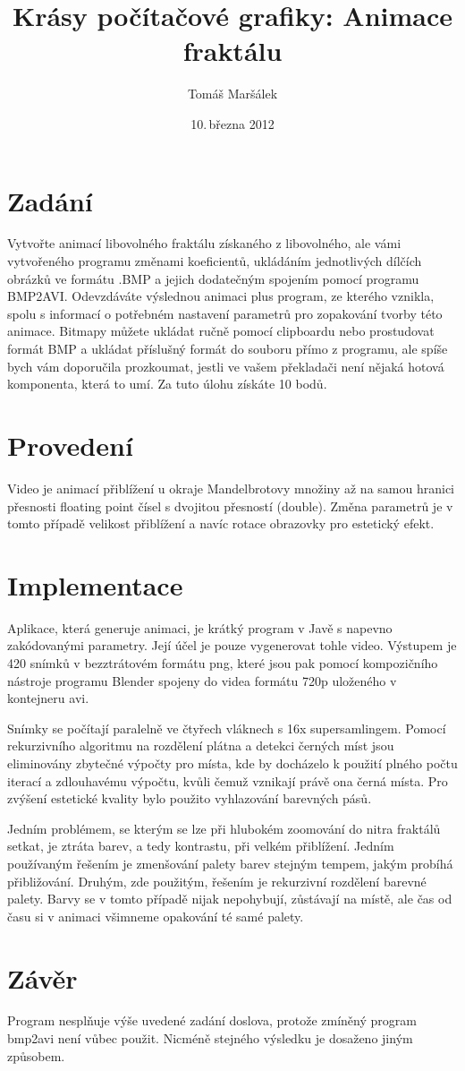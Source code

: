 \documentclass[11pt]{article}
\title{Krásy počítačové grafiky: Animace fraktálu}
\author{Tomáš Maršálek}
\date{10.\,března 2012}
\begin{document}
\maketitle
\section{Zadání}
Vytvořte animací libovolného fraktálu získaného z libovolného, ale vámi
vytvořeného programu změnami koeficientů, ukládáním jednotlivých dílčích
obrázků ve formátu .BMP a jejich dodatečným spojením pomocí programu BMP2AVI.
Odevzdáváte výslednou animaci plus program, ze kterého vznikla, spolu s
informací o potřebném nastavení parametrů pro zopakování tvorby této animace.
Bitmapy můžete ukládat ručně pomocí clipboardu nebo prostudovat formát BMP a
ukládat příslušný formát do souboru přímo z programu, ale spíše bych vám
doporučila prozkoumat, jestli ve vašem překladači není nějaká hotová
komponenta, která to umí. Za tuto úlohu získáte 10 bodů.

\section{Provedení}
Video je animací přiblížení u okraje Mandelbrotovy množiny až na samou hranici
přesnosti floating point čísel s dvojitou přesností (double). Změna parametrů
je v tomto případě velikost přiblížení a navíc rotace obrazovky pro estetický
efekt.

\section{Implementace}
Aplikace, která generuje animaci, je krátký program v Javě s napevno
zakódovanými parametry. Její účel je pouze vygenerovat tohle video. Výstupem je
420 snímků v bezztrátovém formátu png, které jsou pak pomocí kompozičního
nástroje programu Blender spojeny do videa formátu 720p uloženého v kontejneru
avi.

Snímky se počítají paralelně ve čtyřech vláknech s 16x supersamlingem. Pomocí
rekurzivního algoritmu na rozdělení plátna a detekci černých míst jsou
eliminovány zbytečné výpočty pro místa, kde by docházelo k použití plného počtu
iterací a zdlouhavému výpočtu, kvůli čemuž vznikají právě ona černá místa. Pro
zvýšení estetické kvality bylo použito vyhlazování barevných pásů.

Jedním problémem, se kterým se lze při hlubokém zoomování do nitra fraktálů
setkat, je ztráta barev, a tedy kontrastu, při velkém přiblížení. Jedním
používaným řešením je zmenšování palety barev stejným tempem, jakým probíhá
přibližování. Druhým, zde použitým, řešením je rekurzivní rozdělení barevné
palety. Barvy se v tomto případě nijak nepohybují, zůstávají na místě, ale čas
od času si v animaci všimneme opakování té samé palety.

\section{Závěr}
Program nesplňuje výše uvedené zadání doslova, protože zmíněný program bmp2avi
není vůbec použit. Nicméně stejného výsledku je dosaženo jiným způsobem.
\end{document}
